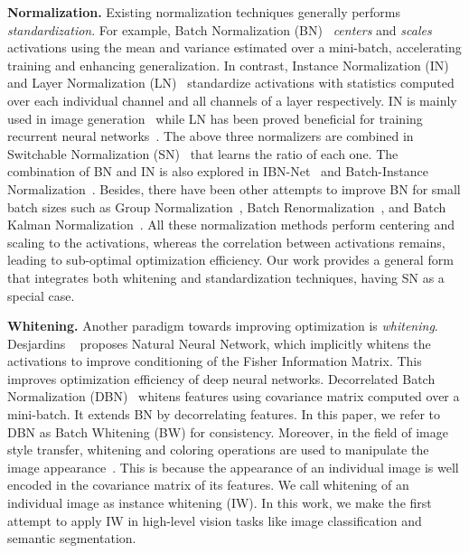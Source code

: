 \documentclass[10pt,twocolumn,letterpaper]{article}
\begin{document}
\noindent\textbf{Normalization.} Existing normalization techniques generally performs \textit{standardization}.
For example, Batch Normalization (BN)~\cite{ioffe2015batch} \textit{centers} and \textit{scales} activations using the mean and variance estimated over a mini-batch, accelerating training and enhancing generalization.
In contrast, Instance Normalization (IN)~\cite{ulyanov2017improved} and Layer Normalization (LN)~\cite{ba2016layer} standardize activations with statistics computed over each individual channel and all channels of a layer respectively.
IN is mainly used in image generation~\cite{huang2017arbitrary,ulyanov2017improved} while LN has been proved beneficial for training recurrent neural networks~\cite{ba2016layer}.
The above three normalizers are combined in Switchable Normalization (SN)~\cite{luo2018differentiable} that learns the ratio of each one.
The combination of BN and IN is also explored in IBN-Net~\cite{pan2018two} and Batch-Instance Normalization~\cite{nam2018batch}.
Besides, there have been other attempts to improve BN for small batch sizes such as Group Normalization~\cite{wu2018group}, Batch Renormalization~\cite{ioffe2017batch}, and Batch Kalman Normalization~\cite{wang2018batch}.
All these normalization methods perform centering and scaling to the activations, whereas the correlation between activations remains, leading to sub-optimal optimization efficiency.
Our work provides a general form that integrates both whitening and standardization techniques, having SN as a special case.



\noindent\textbf{Whitening.} Another paradigm towards improving optimization is \textit{whitening}.
Desjardins \etal ~\cite{desjardins2015natural} proposes Natural Neural Network, which implicitly whitens the activations to improve conditioning of the Fisher Information Matrix.
This improves optimization efficiency of deep neural networks.
Decorrelated Batch Normalization (DBN)~\cite{lei2018decorrelated} whitens features using covariance matrix computed over a mini-batch.
It extends BN by decorrelating features.
In this paper, we refer to DBN as Batch Whitening (BW) for consistency.
Moreover, in the field of image style transfer, whitening and coloring operations are used to manipulate the image appearance~\cite{li2017universal,siarohin2018whitening}.
This is because the appearance of an individual image is well encoded in the covariance matrix of its features.
We call whitening of an individual image as instance whitening (IW).
In this work, we make the first attempt to apply IW in high-level vision tasks like image classification and semantic segmentation.
\end{document}
